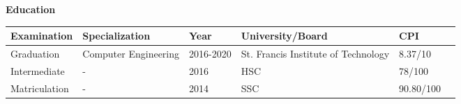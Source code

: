 \colorbox{titleColor}{\parbox{6.7in}{\textbf{Education}}}
\begin{table}[ht]
\hspace{0.8cm}
\begin{tabular}{llllll}
    \hline
    \textbf{Examination} & \textbf{Specialization} & \textbf{Year} & \textbf{University/Board} & \textbf{CPI}\\
    \hline
    Graduation &Computer Engineering&2016-2020&St. Francis Institute of Technology &8.37/10\\
    Intermediate & - & 2016 & HSC& 78/100 \\
    Matriculation & - &2014 & SSC & 90.80/100 \\
    \hline
\end{tabular}
\end{table}